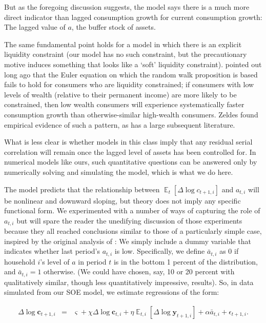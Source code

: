 \documentclass[titlepage]{article}
\DeclareMathOperator{\Ex}{\mathbb{E}} %
\begin{document}
But as the foregoing discussion suggests, the model says there is a much more direct indicator than lagged consumption growth for current consumption growth:  The lagged value of $a$, the buffer stock of assets.

The same fundamental point holds for a model in which there is an explicit liquidity constraint (our model has no such constraint, but the precautionary motive induces something that looks like a `soft' liquidity constraint).  \cite{zeldes:jpe} pointed out long ago that the Euler equation on which the random walk proposition is based fails to hold for consumers who are liquidity constrained; if consumers with low levels of wealth (relative to their permanent income) are more likely to be constrained, then low wealth consumers will experience systematically faster consumption growth than otherwise-similar high-wealth consumers.  Zeldes found empirical evidence of such a pattern, as has a large subsequent literature.

What is less clear is whether models in this class imply that any residual serial correlation will remain once the lagged level of assets has been controlled for.  In numerical models like ours, such quantitative questions can be answered only by numerically solving and simulating the model, which is what we do here.

The model predicts that the relationship between $\Ex_{t}[\Delta \log c_{t+1,i}]$ and $a_{t,i}$ will be nonlinear and downward sloping, but theory does not imply any specific functional form.  We experimented with a number of ways of capturing the role of $a_{t,i}$ but will spare the reader the unedifying discussion of those experiments because they all reached conclusions similar to those of a particularly simple case, inspired by the original analysis of \cite{zeldes:jpe}: We simply include a dummy variable that indicates whether last period's $a_{t,i}$ is low.  Specifically, we define $\bar{a}_{t,i}$ as 0 if household $i$'s level of ${a}$ in period $t$ is in the bottom 1 percent of the distribution, and $\bar{a}_{t,i}=1$ otherwise.  (We could have chosen, say, 10 or 20 percent with qualitatively similar, though less quantitatively impressive, results). So, in data simulated from our SOE model, we estimate regressions of the form: 

 \begin{eqnarray*}
\Delta \log       \mathbf{c} _{t+1,i}  &=&  \varsigma + \chi \Delta \log      \mathbf{c} _{t,i} + \eta     {\Ex}_{t,i}[\Delta \log       \mathbf{y} _{t+1,i}]+ {\alpha} \bar{a}_{t,i}+\epsilon_{t+1,i}.
\end{eqnarray*}
\end{document}
